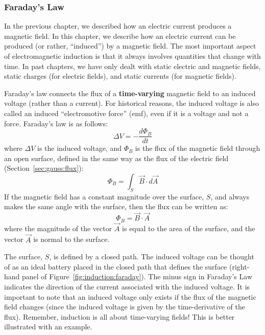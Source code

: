 \subsubsection{Faraday's Law}

In the previous chapter, we described how an electric current produces a magnetic field. In this chapter, we describe how an electric current can be produced (or rather, ``induced'') by a magnetic field. The most important aspect of electromagnetic induction is that it always involves quantities that change with time. In past chapters, we have only dealt with static electric and magnetic fields, static charges (for electric fields), and static currents (for magnetic fields).

Faraday's law connects the flux of a \textbf{time-varying} magnetic field to an induced voltage (rather than a current). For historical reasons, the induced voltage is also called an induced ``electromotive force'' (emf), even if it is a voltage and not a force. Faraday's law is as follows:
\begin{equation}
\boxed{\Delta V = -\frac{d\Phi_B}{dt}}
\end{equation}
where $\Delta V$ is the induced voltage, and  $\Phi_B$ is the flux of the magnetic field through an open surface, defined in the same way as the flux of the electric field (Section~\ref{sec:gauss:flux}):
\begin{equation}
\Phi_B = \int_S \vec B\cdot d\vec A
\end{equation}
If the magnetic field has a constant magnitude over the surface, $S$, and always makes the same angle with the surface, then the flux can be written as:
\begin{equation}
\Phi_B =  \vec B\cdot\vec A
\end{equation}
where the magnitude of the vector $\vec A$ is equal to the area of the surface, and the vector $\vec A$ is normal to the surface.

The surface, $S$, is defined by a closed path. The induced voltage can be thought of as an ideal battery placed in the closed path that defines the surface (right-hand panel of Figure~\ref{fig:induction:faraday}). The minus sign in Faraday's Law indicates the direction of the current associated with the induced voltage. It is important to note that an induced voltage only exists if the flux of the magnetic field changes (since the induced voltage is given by the time-derivative of the flux). Remember, induction is all about time-varying fields! This is better illustrated with an example.

